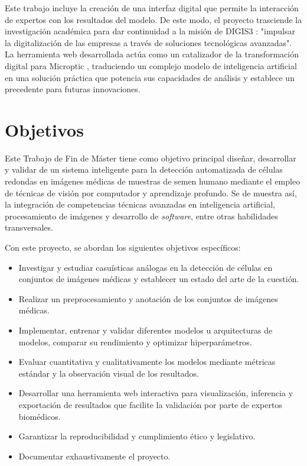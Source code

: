 \documentclass[12pt,a4paper,onecolumn,oneside]{report}
\begin{document}
Este trabajo incluye la creación de una interfaz digital que permite la interacción de expertos con los resultados del modelo.
De este modo, el proyecto trasciende la investigación académica para dar continuidad a la misión de DIGIS3 \cite{digis3}: "impulsar la digitalización de las empresas a través 
de soluciones tecnológicas avanzadas". La herramienta web desarrollada actúa como un catalizador de la transformación digital para Microptic \cite{microptic}, traduciendo 
un complejo modelo de inteligencia artificial en una solución práctica que potencia sus capacidades de análisis y establece un precedente para futuras innovaciones.

\section{Objetivos}
\label{sec:Objetivos}

Este Trabajo de Fin de Máster tiene como objetivo principal diseñar, desarrollar y validar de un sistema inteligente para la detección automatizada de células redondas en imágenes médicas de muestras de semen humano
mediante el empleo de técnicas de visión por computador y aprendizaje profundo. 
Se de muestra así, la integración de competencias técnicas avanzadas en inteligencia artificial, procesamiento de imágenes y desarrollo de \textit{software}, entre otras habilidades transversales. 

Con este proyecto, se abordan los siguientes objetivos específicos: 

\begin{itemize}
  \item Investigar y estudiar casuísticas análogas en la detección de células en conjuntos de imágenes médicas y establecer un estado del arte de la cuestión.
  \item Realizar un preprocesamiento y anotación de los conjuntos de imágenes médicas.
  \item Implementar, entrenar y validar diferentes modelos u arquitecturas de modelos, comparar su rendimiento y optimizar hiperparámetros.
  \item Evaluar cuantitativa y cualitativamente los modelos mediante métricas estándar y la observación visual de los resultados.
  \item Desarrollar una herramienta web interactiva para visualización, inferencia y exportación de resultados que facilite la validación por parte de expertos biomédicos.
  \item Garantizar la reproducibilidad y cumplimiento ético y legislativo.
  \item Documentar exhaustivamente el proyecto.
\end{itemize}
\end{document}
